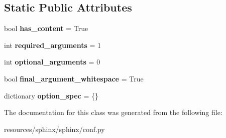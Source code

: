 \subsection*{Static Public Attributes}
\begin{DoxyCompactItemize}
\item 
bool {\bfseries has\+\_\+content} = True\hypertarget{classconf_1_1IfMode_aaea7225a5870ca4481d04f6ae781413f}{}\label{classconf_1_1IfMode_aaea7225a5870ca4481d04f6ae781413f}

\item 
int {\bfseries required\+\_\+arguments} = 1\hypertarget{classconf_1_1IfMode_a6178050b552e80e923a467486ae3b6db}{}\label{classconf_1_1IfMode_a6178050b552e80e923a467486ae3b6db}

\item 
int {\bfseries optional\+\_\+arguments} = 0\hypertarget{classconf_1_1IfMode_a76d350d5aabb8c2dbdf47199a4b5b594}{}\label{classconf_1_1IfMode_a76d350d5aabb8c2dbdf47199a4b5b594}

\item 
bool {\bfseries final\+\_\+argument\+\_\+whitespace} = True\hypertarget{classconf_1_1IfMode_aeb33a9725e6fc1216412d321cd46db09}{}\label{classconf_1_1IfMode_aeb33a9725e6fc1216412d321cd46db09}

\item 
dictionary {\bfseries option\+\_\+spec} = \{\}\hypertarget{classconf_1_1IfMode_a0e789bd8ead3911da5a47a2ed0f66cb7}{}\label{classconf_1_1IfMode_a0e789bd8ead3911da5a47a2ed0f66cb7}

\end{DoxyCompactItemize}


The documentation for this class was generated from the following file\+:\begin{DoxyCompactItemize}
\item 
resources/sphinx/sphinx/conf.\+py\end{DoxyCompactItemize}
